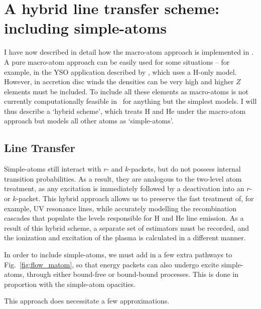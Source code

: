 \section{A hybrid line transfer scheme: including simple-atoms}

I have now described in detail how the macro-atom approach is 
implemented in \py. A pure macro-atom approach can be easily used for
some situations -- for example, in the YSO application described by 
\cite{simmacro2005}, which uses a H-only model. However, in accretion
disc winds the densities can be very high and higher $Z$ elements must be 
included. To include all these elements as macro-atoms is not
currently computationally feasible in \py\ for anything but the simplest
models. I will thus describe a `hybrid scheme', which treats H and He
under the macro-atom approach but models all other atoms 
as `simple-atoms'. 

\subsection{Line Transfer}

Simple-atoms still interact with $r$- and $k$-packets,
but do not possess internal transition probabilities. As a result,
they are analogous to the two-level atom treatment, as any excitation
is immediately followed by a deactivation into an $r$- or $k$-packet.
This hybrid approach allows us to preserve the fast treatment 
of, for example, UV resonance lines, while accurately 
modelling the recombination cascades that populate the levels 
responsible for H and He line emission. As a result of this hybrid
scheme, a separate set of estimators must be recorded, and the ionization
and excitation of the plasma is calculated in a different manner.

In order to include simple-atoms, we must add in a few extra pathways
to Fig.~\ref{fig:flow_matom}, so that energy packets can also
undergo excite simple-atoms, through either bound-free or bound-bound
processes. This is done in proportion with the simple-atom opacities.

This approach does necessitate a few approximations.

